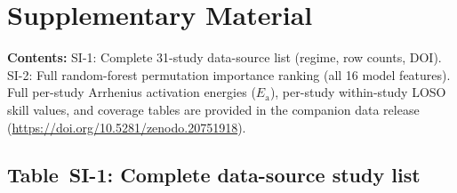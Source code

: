 
\clearpage
\appendix
\section*{Supplementary Material}
\setcounter{table}{0}
\renewcommand{\thetable}{SI-\arabic{table}}
\setcounter{figure}{0}
\renewcommand{\thefigure}{SI-\arabic{figure}}

\noindent\textbf{Contents:}
SI-1: Complete 31-study data-source list (regime, row counts, DOI).
SI-2: Full random-forest permutation importance ranking (all 16 model features).
Full per-study Arrhenius activation energies ($E_\mathrm{a}$), per-study within-study
LOSO skill values, and coverage tables are provided in the companion data release (\url{https://doi.org/10.5281/zenodo.20751918}).

\subsection*{Table~SI-1: Complete data-source study list}

